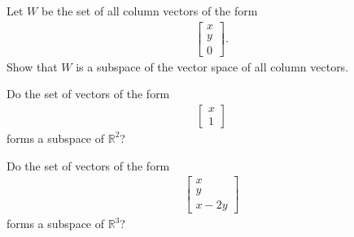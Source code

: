\documentclass[12pt,a4paper]{article}
\newcounter{example}[section]
\begin{document}
	\vspace*{18pt}
	
	\begin{example}
	Let $W$ be the set of all column vectors of the form
		\begin{align*}
		\begin{bmatrix}
		x \\ y \\ 0
		\end{bmatrix} .
		\end{align*}
	Show that $W$ is a subspace of the vector space of all column vectors.
	\end{example}
	
	\vfill
	
	\begin{example}
	Do the set of vectors of the form
		\begin{align*}
		\begin{bmatrix}
		x \\ 1
		\end{bmatrix}
		\end{align*}
	forms a subspace of $\mathbb{R}^2$?
	\end{example}
	
	\vfill
	
	\newpage
	
	\begin{example}
	Do the set of vectors of the form
		\begin{align*}
		\begin{bmatrix}
		x \\ y \\ x - 2y
		\end{bmatrix}
		\end{align*}
	forms a subspace of $\mathbb{R}^3$?
	\end{example}
	

	\newpage
	
	
	
	
\end{document}

